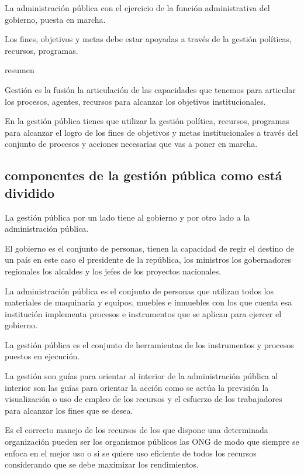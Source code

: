 \documentclass[
  a4paper,
]{article}
\begin{document}
La administración pública con el ejercicio de la función administrativa
del gobierno, puesta en marcha.

Los fines, objetivos y metas debe estar apoyadas a través de la gestión
políticas, recursos, programas.

resumen

Gestión es la fusión la articulación de las capacidades que tenemos para
articular los procesos, agentes, recursos para alcanzar los objetivos
institucionales.

En la gestión pública tienes que utilizar la gestión política, recursos,
programas para alcanzar el logro de los fines de objetivos y metas
institucionales a través del conjunto de procesos y acciones necesarias
que vas a poner en marcha.

\hypertarget{componentes-de-la-gestiuxf3n-puxfablica-como-estuxe1-dividido}{%
\subsection{componentes de la gestión pública como está
dividido}\label{componentes-de-la-gestiuxf3n-puxfablica-como-estuxe1-dividido}}

La gestión pública por un lado tiene al gobierno y por otro lado a la
administración pública.

El gobierno es el conjunto de personas, tienen la capacidad de regir el
destino de un país en este caso el presidente de la república, los
ministros los gobernadores regionales los alcaldes y los jefes de los
proyectos nacionales.

La administración pública es el conjunto de personas que utilizan todos
los materiales de maquinaria y equipos, muebles e inmuebles con los que
cuenta esa institución implementa procesos e instrumentos que se aplican
para ejercer el gobierno.

La gestión pública es el conjunto de herramientas de los instrumentos y
procesos puestos en ejecución.

La gestión son guías para orientar al interior de la administración
pública al interior son las guías para orientar la acción como se actúa
la previsión la visualización o uso de empleo de los recursos y el
esfuerzo de los trabajadores para alcanzar los fines que se desea.

Es el correcto manejo de los recursos de los que dispone una determinada
organización pueden ser los organismos públicos las ONG de modo que
siempre se enfoca en el mejor uso o si se quiere uso eficiente de todos
los recursos considerando que se debe maximizar los rendimientos.
\end{document}
